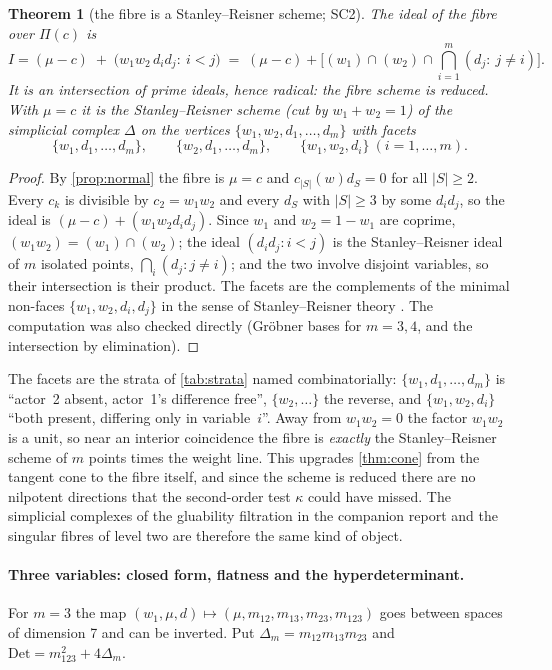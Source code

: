 \documentclass[11pt]{article}
\newtheorem{theorem}{Theorem}\newtheorem{proposition}[theorem]{Proposition}\newtheorem{corollary}[theorem]{Corollary}
\theoremstyle{definition}\newtheorem{definition}[theorem]{Definition}\newtheorem{remark}[theorem]{Remark}\newtheorem{example}[theorem]{Example}
\begin{document}
\begin{theorem}[the fibre is a Stanley--Reisner scheme; SC2]\label{thm:sr}
The ideal of the fibre over $\Pi(c)$ is
\[
  I=(\mu-c)\;+\;\big(w_1w_2\,d_id_j:\ i<j\big)\;=\;(\mu-c)+\Big[(w_1)\cap(w_2)\cap\bigcap_{i=1}^m(d_j:\ j\neq i)\Big].
\]
It is an intersection of prime ideals, hence radical: the fibre scheme is reduced. With $\mu=c$ it is the Stanley--Reisner scheme
(cut by $w_1+w_2=1$) of the simplicial complex $\Delta$ on the vertices $\{w_1,w_2,d_1,\dots,d_m\}$ with facets
\[
  \{w_1,d_1,\dots,d_m\},\qquad\{w_2,d_1,\dots,d_m\},\qquad\{w_1,w_2,d_i\}\ (i=1,\dots,m).
\]
\end{theorem}

\begin{proof}
By \cref{prop:normal} the fibre is $\mu=c$ and $c_{|S|}(w)d_S=0$ for all $|S|\ge2$. Every $c_k$ is divisible by $c_2=w_1w_2$ and every
$d_S$ with $|S|\ge3$ by some $d_id_j$, so the ideal is $(\mu-c)+(w_1w_2d_id_j)$. Since $w_1$ and $w_2=1-w_1$ are coprime,
$(w_1w_2)=(w_1)\cap(w_2)$; the ideal $(d_id_j:i<j)$ is the Stanley--Reisner ideal of $m$ isolated points, $\bigcap_i(d_j:j\neq i)$; and
the two involve disjoint variables, so their intersection is their product. The facets are the complements of the minimal non-faces
$\{w_1,w_2,d_i,d_j\}$ in the sense of Stanley--Reisner theory \cite{MillerSturmfels2005}. The computation was also checked directly
(Gr\"obner bases for $m=3,4$, and the intersection by elimination).
\end{proof}

The facets are the strata of \cref{tab:strata} named combinatorially: $\{w_1,d_1,\dots,d_m\}$ is ``actor~2 absent, actor~1's
difference free'', $\{w_2,\dots\}$ the reverse, and $\{w_1,w_2,d_i\}$ ``both present, differing only in variable~$i$''. Away from
$w_1w_2=0$ the factor $w_1w_2$ is a unit, so near an interior coincidence the fibre is \emph{exactly} the Stanley--Reisner scheme of $m$
points times the weight line. This upgrades \cref{thm:cone} from the tangent cone to the fibre itself, and since the scheme is reduced
there are no nilpotent directions that the second-order test $\kappa$ could have missed. The simplicial complexes of the gluability
filtration in the companion report \cite{Main} and the singular fibres of level two are therefore the same kind of object.

\paragraph{Three variables: closed form, flatness and the hyperdeterminant.}
For $m=3$ the map $(w_1,\mu,d)\mapsto(\mu,m_{12},m_{13},m_{23},m_{123})$ goes between spaces of dimension 7 and can be inverted. Put
$\Delta_m=m_{12}m_{13}m_{23}$ and $\mathrm{Det}=m_{123}^2+4\Delta_m$.
\end{document}
